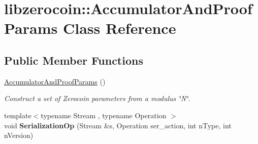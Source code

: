 \hypertarget{classlibzerocoin_1_1_accumulator_and_proof_params}{}\section{libzerocoin\+::Accumulator\+And\+Proof\+Params Class Reference}
\label{classlibzerocoin_1_1_accumulator_and_proof_params}
\subsection*{Public Member Functions}
\begin{DoxyCompactItemize}
\item 
\mbox{\hyperlink{classlibzerocoin_1_1_accumulator_and_proof_params_ad5e69167694e5614940d89f3d1c5fbc5}{Accumulator\+And\+Proof\+Params}} ()
\begin{DoxyCompactList}\small\item\em Construct a set of Zerocoin parameters from a modulus \char`\"{}\+N\char`\"{}. \end{DoxyCompactList}\item 
\mbox{\label{classlibzerocoin_1_1_accumulator_and_proof_params_a1f0f08beef05bc9b972c4b6c8fc83a0c}} 
{\footnotesize template$<$typename Stream , typename Operation $>$ }\\void {\bfseries Serialization\+Op} (Stream \&s, Operation ser\+\_\+action, int n\+Type, int n\+Version)
\end{DoxyCompactItemize}
